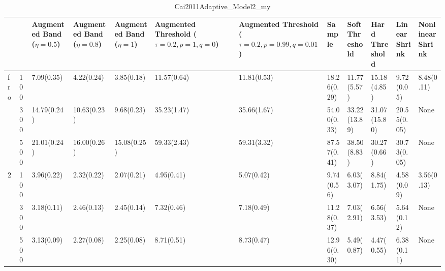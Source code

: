 \begin{table}[htbp]
\centering
\caption{Cai2011Adaptive_Model2_my}
\label{my label}
\begin{tabular}{ll|p{2cm}p{2cm}p{2cm}p{2cm}p{2cm}p{2cm}p{2cm}p{2cm}p{2cm}p{2cm}}
\toprule
  &     & Augmented Band ($\eta=0.5$) & Augmented Band ($\eta=0.8$) & Augmented Band ($\eta=1$) & Augmented Threshold ($\tau=0.2, p=1, q=0$) & Augmented Threshold ($\tau=0.2, p=0.99, q=0.01$) &       Sample & Soft Threshold & Hard Threshold & Linear Shrink & Nonlinear Shrink \\
\midrule
fro & 100 &                  7.09(0.35) &                  4.22(0.24) &                3.85(0.18) &                                11.57(0.64) &                                      11.81(0.53) &  18.26(0.29) &    11.77(5.57) &    15.18(4.85) &    9.72(0.05) &       8.48(0.11) \\
  & 300 &                 14.79(0.24) &                 10.63(0.23) &                9.68(0.23) &                                35.23(1.47) &                                      35.66(1.67) &  54.00(0.33) &   33.22(13.89) &   31.07(15.80) &   20.55(0.05) &             None \\
  & 500 &                 21.01(0.24) &                 16.00(0.26) &               15.08(0.25) &                                59.33(2.43) &                                      59.31(3.32) &  87.57(0.41) &    38.50(8.83) &    30.27(0.66) &   30.73(0.05) &             None \\
2 & 100 &                  3.96(0.22) &                  2.32(0.22) &                2.07(0.21) &                                 4.95(0.41) &                                       5.07(0.42) &   9.74(0.56) &     6.03(3.07) &     8.84(1.75) &    4.58(0.09) &       3.56(0.13) \\
  & 300 &                  3.18(0.11) &                  2.46(0.13) &                2.45(0.14) &                                 7.32(0.46) &                                       7.18(0.49) &  11.28(0.37) &     7.03(2.91) &     6.56(3.53) &    5.64(0.12) &             None \\
  & 500 &                  3.13(0.09) &                  2.27(0.08) &                2.25(0.08) &                                 8.71(0.51) &                                       8.73(0.47) &  12.96(0.30) &     5.49(0.87) &     4.47(0.55) &    6.38(0.11) &             None \\
\bottomrule
\end{tabular}
\end{table}
